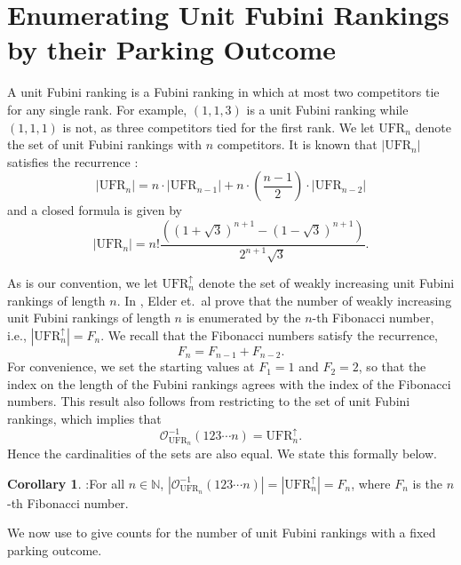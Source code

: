\documentclass{amsart}
\theoremstyle{definition}
\newtheorem{corollary}{Corollary}[section]
\theoremstyle{definition}
\newcommand{\seqnum}[1]{\href{https://oeis.org/#1}{#1}}
\theoremstyle{remark}
\newcommand{\UFR}[1]{\mathrm{UFR}_{#1}}
\newcommand{\out}{\mathcal{O}}
\begin{document}
\section{Enumerating Unit Fubini Rankings by their Parking Outcome}\label{sec:UFRs}
A unit Fubini ranking is a Fubini ranking in which at most two competitors tie for any single rank. 
For example,  $(1,1,3)$ is a unit Fubini ranking while $(1,1,1)$ is not, as three competitors tied for the first rank. 
We let $\UFR{n}$ denote the set of unit Fubini rankings with $n$ competitors. 
It is known that $|\UFR{n}|$ satisfies the recurrence \cite[\seqnum{A080599}]{OEIS}: 
\[|\UFR{n}|=n\cdot|\UFR{n-1}|+n\cdot\left(\frac{n-1}{2}\right)\cdot |\UFR{n-2}|\]
and a closed formula is given by 
\[|\UFR{n}|=n!\frac{\left((1+\sqrt{3})^{n+1}-(1-\sqrt{3})^{n+1}\right)}{2^{n+1}\sqrt{3}}.\]

As is our convention, we let $\UFR{n}^\uparrow$ denote the set of weakly increasing unit Fubini rankings of length $n$. 
In \cite[Theorem 3.18]{weak}, Elder et.\ al prove that the number of weakly increasing unit Fubini rankings of length $n$ is enumerated by the $n$-th Fibonacci number, i.e., $|\UFR{n}^\uparrow|=F_{n}$. We recall that the Fibonacci numbers satisfy the recurrence,
\[F_n=F_{n-1}+F_{n-2}.\]
For convenience, we set the starting values at $F_1=1$ and $F_2=2$, so that the index on the length of the Fubini rankings agrees with the index of the Fibonacci numbers. 
This result also follows from 
restricting  to the set of unit Fubini rankings, which implies that 
\[\out_{\UFR{n}}^{-1}(123\cdots n)=\UFR{n}^\uparrow.\]
Hence the cardinalities of the sets are also equal. 
We state this formally below.

 \begin{corollary}\cite[Theorem 3.18]{weak}:\label{cor:outcome identity is all weakly increasing}
     For all $n\in\mathbb{N}$, $|\out^{-1}_{\UFR{n}}(123\cdots n)|=|\UFR{n}^\uparrow|=F_{n}$, where $F_{n}$ is the $n$-th Fibonacci number.
 \end{corollary}

 
We now use  to give counts for the number of unit Fubini rankings with a fixed parking outcome.
\end{document}
